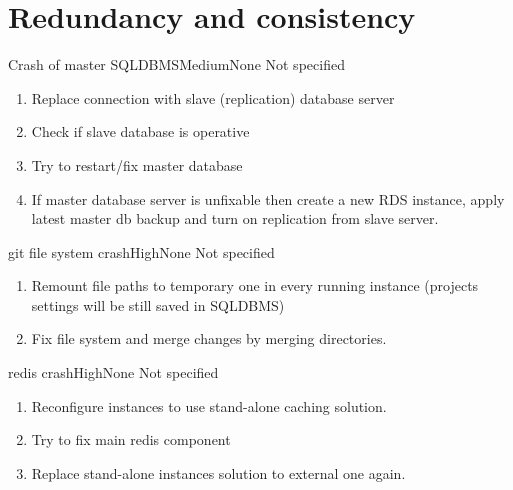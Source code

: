 \section{Redundancy and consistency} \label{s:test-cases:redundancy-and-consistency}
\begin{testcase}{Crash of master \gls{SQLDBMS}}{Medium}{None}
	{
		 	Not specified	
	}
	{
		\begin{enumerate}
			\item Replace connection with slave (replication) database server
			\item Check if slave database is operative
			\item Try to restart/fix master database
			\item If master database server is unfixable then create a new \gls{RDS} instance, apply latest master db backup and turn on replication from slave server.
		\end{enumerate}
	}
\end{testcase}

\begin{testcase}{\gls{git} file system crash}{High}{None}
	{
		Not specified
	}
	{
		\begin{enumerate}
			\item Remount file paths to temporary one in every running instance (projects settings will be still saved in \gls{SQLDBMS})
			\item Fix file system and merge changes by merging directories.
		\end{enumerate}
	}
\end{testcase}
\clearpage
\begin{testcase}{\gls{redis} crash}{High}{None}
	{
		Not specified
	}
	{
		\begin{enumerate}
			\item Reconfigure instances to use stand-alone caching solution.
			\item Try to fix main \gls{redis} component
			\item Replace stand-alone instances solution to external one again.
		\end{enumerate}
	}
\end{testcase}

